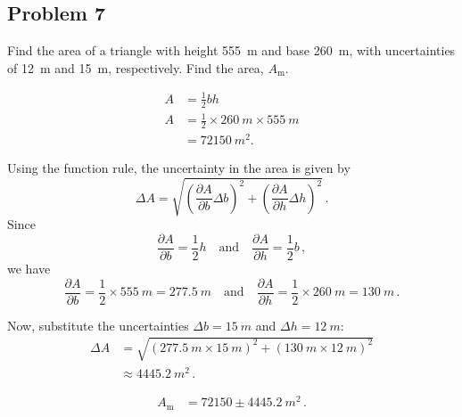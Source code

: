 
\subsection{Problem 7}

Find the area of a triangle with height \SI{555}{m} and base \SI{260}{m}, with uncertainties of \SI{12}{m} and \SI{15}{m}, respectively. Find the area, $A_{\mathrm{m}}$.

\begin{align*}
	A &= \frac{1}{2} b h \\
	A &= \frac{1}{2} \times \SI{260}{m} \times \SI{555}{m} \\
	&= \SI{72150}{m^2}
	.\end{align*}

Using the function rule, the uncertainty in the area is given by
\[
	\Delta A = \sqrt{\left(\frac{\partial A}{\partial b}\Delta b\right)^2 + \left(\frac{\partial A}{\partial h}\Delta h\right)^2}\,.
\]
Since
\[
	\frac{\partial A}{\partial b} = \frac{1}{2}h \quad \text{and} \quad \frac{\partial A}{\partial h} = \frac{1}{2}b\,,
\]
we have
\[
	\frac{\partial A}{\partial b} = \frac{1}{2}\times\SI{555}{m} = \SI{277.5}{m} \quad \text{and} \quad \frac{\partial A}{\partial h} = \frac{1}{2}\times\SI{260}{m} = \SI{130}{m}\,.
\]

Now, substitute the uncertainties \(\Delta b = \SI{15}{m}\) and \(\Delta h = \SI{12}{m}\):
\begin{align*}
	\Delta A &= \sqrt{\left(\SI{277.5}{m}\times\SI{15}{m}\right)^2 + \left(\SI{130}{m}\times\SI{12}{m}\right)^2} \\
	&\approx \SI{4445.2}{m^2}\,.
\end{align*}

\begin{align*}
	A_{\mathrm{m}} &= 72150 \pm \SI{4445.2}{m^2}\,.
\end{align*}

